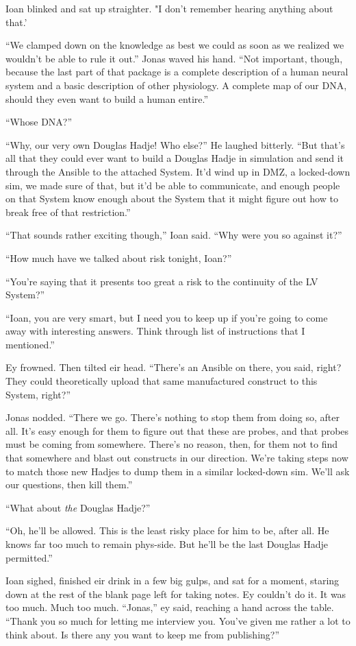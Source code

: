 Ioan blinked and sat up straighter. "I don't remember hearing anything about that.'

``We clamped down on the knowledge as best we could as soon as we realized we wouldn't be able to rule it out.'' Jonas waved his hand. ``Not important, though, because the last part of that package is a complete description of a human neural system and a basic description of other physiology. A complete map of our DNA, should they even want to build a human entire.''

``Whose DNA?''

``Why, our very own Douglas Hadje! Who else?'' He laughed bitterly. ``But that's all that they could ever want to build a Douglas Hadje in simulation and send it through the Ansible to the attached System. It'd wind up in DMZ, a locked-down sim, we made sure of that, but it'd be able to communicate, and enough people on that System know enough about the System that it might figure out how to break free of that restriction.''

``That sounds rather exciting though,'' Ioan said. ``Why were you so against it?''

``How much have we talked about risk tonight, Ioan?''

``You're saying that it presents too great a risk to the continuity of the LV System?''

``Ioan, you are very smart, but I need you to keep up if you're going to come away with interesting answers. Think through list of instructions that I mentioned.''

Ey frowned. Then tilted eir head. ``There's an Ansible on there, you said, right? They could theoretically upload that same manufactured construct to this System, right?''

Jonas nodded. ``There we go. There's nothing to stop them from doing so, after all. It's easy enough for them to figure out that these are probes, and that probes must be coming from somewhere. There's no reason, then, for them not to find that somewhere and blast out constructs in our direction. We're taking steps now to match those new Hadjes to dump them in a similar locked-down sim. We'll ask our questions, then kill them.''

``What about \emph{the} Douglas Hadje?''

``Oh, he'll be allowed. This is the least risky place for him to be, after all. He knows far too much to remain phys-side. But he'll be the last Douglas Hadje permitted.''

Ioan sighed, finished eir drink in a few big gulps, and sat for a moment, staring down at the rest of the blank page left for taking notes. Ey couldn't do it. It was too much. Much too much. ``Jonas,'' ey said, reaching a hand across the table. ``Thank you so much for letting me interview you. You've given me rather a lot to think about. Is there any you want to keep me from publishing?''

